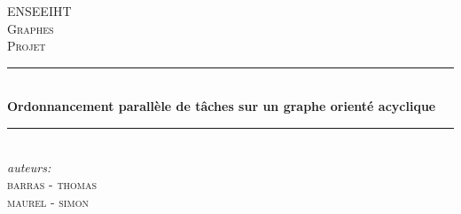 \documentclass{report}
\begin{document}
\begin{titlepage}

\newcommand{\HRule}{\rule{\linewidth}{0.5mm}} %

\center %
 

\textsc{\LARGE ENSEEIHT}\\[1.5cm] %
\textsc{\Large Graphes}\\[0.5cm] %
\textsc{\large Projet}\\[0.5cm] %


\HRule \\[0.4cm]
{ \huge \bfseries  Ordonnancement parallèle de tâches sur un graphe orienté acyclique}\\[0.4cm] %
\HRule \\[1.5cm]
 

\emph{auteurs:}\\
\textsc{barras} - \textsc{thomas} \\
\textsc{maurel} - \textsc{simon} \\


\date{} %


\vspace{7.2cm}
\begin{center}
\end{center}


\vfill %

\end{titlepage}
\end{document}
